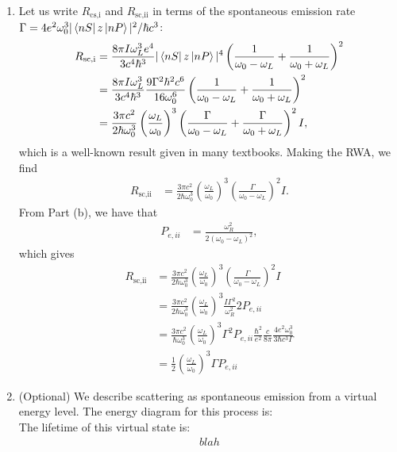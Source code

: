 \documentclass{article}
\theoremstyle{definition}
\newcommand{\f}[2]{\frac{#1}{#2}}
\newcommand{\lp}{\left(}
\newcommand{\rp}{\right)}
\begin{document}
\begin{enumerate}[label=(\alph*)]
\begin{enumerate}[label=(\roman*)]
		\item Let us write $R_\text{cs,i}$ and $R_\text{sc,ii}$ in terms of the spontaneous emission rate $\Gamma = 4e^2 \omega_0^3 |\bra{nS}z\ket{nP}|^2/\hbar c^3$: 
		\begin{align*}
			R_\text{sc,i} &= \f{8\pi I\omega_L^3 e^4}{3 c^4 \hbar^3} |\bra{nS} z \ket{nP}|^4 \lp \f{1}{\omega_0 - \omega_L} + \f{1}{\omega_0 + \omega_L} \rp^2 \\
			&= \f{8\pi I\omega_L^3 }{3 c^4 \hbar^3} \f{9\Gamma^2 \hbar^2 c^6}{16\omega_0^6}  \lp \f{1}{\omega_0 - \omega_L} + \f{1}{\omega_0 + \omega_L} \rp^2\\
			&= \f{3\pi c^2}{2\hbar \omega_0^3}\lp \f{\omega_L}{\omega_0} \rp^3 \lp \f{\Gamma}{\omega_0 - \omega_L} + \f{\Gamma}{\omega_0 + \omega_L} \rp^2 I,
		\end{align*}
	which is a well-known result given in many textbooks. Making the RWA, we find
	\begin{align*}
		R_\text{sc,ii} &= \f{3\pi c^2}{2\hbar \omega_0^3}\lp \f{\omega_L}{\omega_0} \rp^3 \lp \f{\Gamma}{\omega_0 - \omega_L}  \rp^2 I.
	\end{align*}
	From Part (b), we have that
	\begin{align*}
		P_{e,ii} &= \f{\omega_R^2}{2(\omega_0 - \omega_L)^2},
	\end{align*}
	which gives
	\begin{align*}
		R_\text{sc,ii} &=  \f{3\pi c^2}{2\hbar \omega_0^3}\lp \f{\omega_L}{\omega_0} \rp^3 \lp \f{\Gamma}{\omega_0 - \omega_L}  \rp^2 I \\
		&= \f{3\pi c^2}{2\hbar \omega_0^3}\lp \f{\omega_L}{\omega_0} \rp^3 \f{I\Gamma^2 }{\omega_R^2} 2P_{e,ii}\\
		&= \f{3\pi c^2}{\hbar \omega_0^3}\lp \f{\omega_L}{\omega_0} \rp^3 \Gamma^2 P_{e,ii} \f{\hbar^2}{e^2}\f{c}{8\pi} \f{4e^2\omega_0^3}{3\hbar c^3 \Gamma}\\
		&= \boxed{\f{ 1}{2}\lp \f{\omega_L}{\omega_0} \rp^3 \Gamma P_{e,ii}}
	\end{align*}
	
	
	
	
		\item (Optional) We describe scattering as spontaneous emission from a virtual energy level. The energy diagram for this process is:\\
		
		
		The lifetime of this virtual state is:
		\begin{align*}
			blah
		\end{align*}
	\end{enumerate}
	

\end{enumerate}
\end{document}
